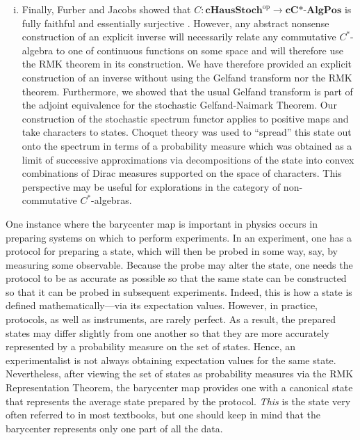 \documentclass[12pt]{article}
\theoremstyle{theorem}
\theoremstyle{definition}
\numberwithin{equation}{section}
\newcommand{\<}{\langle}
\renewcommand{\>}{\rangle}
\newcommand{\cCAlgPos}{\mathbf{cC\text{*-}AlgPos}}
\newcommand{\op}{\mathrm{op}}
\newcommand{\cHStoch}{\mathbf{cHausStoch}}
\begin{document}
\begin{enumerate}[i.]
\item
Finally, Furber and Jacobs showed that 
$C:\cHStoch^{\op}\to\cCAlgPos$ is 
fully faithful and essentially surjective \cite{FuJa13}.
However, 
any abstract nonsense construction of an explicit inverse will necessarily
relate any commutative $C^*$-algebra to one
of continuous functions on some space and will therefore use the 
RMK theorem in its construction. 
We have therefore provided an explicit construction of an inverse
without using the Gelfand transform nor the RMK theorem. 
Furthermore, we showed that the usual Gelfand transform is
part of the adjoint equivalence for the stochastic Gelfand-Naimark Theorem. 
Our construction of the stochastic spectrum functor applies to 
positive maps and take characters to states. Choquet theory 
was used to ``spread'' this state out onto the spectrum in terms
of a probability measure which was obtained as a limit of 
successive approximations via decompositions of the state into convex
combinations of Dirac measures supported on the space of characters. 
This perspective may be useful for 
explorations in the category of non-commutative $C^*$-algebras. 
\end{enumerate}

One instance where the barycenter map is important in physics occurs in
preparing systems on which to perform experiments. 
In an experiment, one has a protocol for preparing a state, which will
then be probed in some way, say, by measuring some observable. 
Because the probe may alter the state, 
one needs the protocol to be as accurate as possible so that the
same state can be constructed so that it can be probed in subsequent experiments. 
Indeed, this is how a state is defined mathematically---via its expectation 
values.
However, in practice, protocols, as well as instruments, are rarely
perfect. As a result, the prepared states may differ slightly from one another
so that they are more accurately represented by a probability measure
on the set of states. Hence, an experimentalist is not always obtaining
expectation values for the same state. Nevertheless,
after viewing the set of states as probability measures via the RMK
Representation Theorem,
the barycenter map provides one with a canonical state that 
represents the average state prepared by the protocol. 
\emph{This} is the state very often referred to in most textbooks, 
but one should keep in mind that the barycenter represents only one part
of all the data. 

\end{document}
